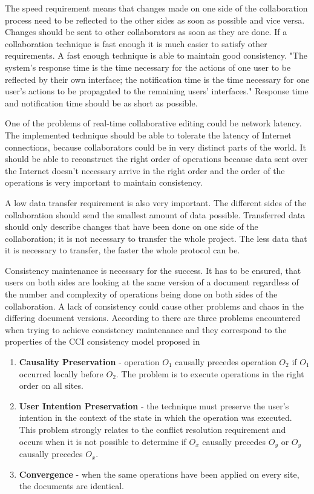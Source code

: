 \documentclass[12pt,oneside]{fithesis2}
\begin{document}
\par The speed requirement means that changes made on one side of the collaboration process need to be reflected to the other sides as soon as possible and vice versa. Changes should be sent to other collaborators as soon as they are done. If a collaboration technique is fast enough it is much easier to satisfy other requirements. A fast enough technique is able to maintain good consistency. "The system’s response time is the time necessary for the actions of one user to be reflected by their own interface; the notification time is the time necessary for one user’s actions to be propagated to the remaining users’ interfaces." \cite{Ellis} Response time and notification time should be as short as possible.  \par One of the problems of real-time collaborative editing could be network latency. The implemented technique should be able to tolerate the latency of Internet connections, because collaborators could be in very distinct parts of the world. It should be able to reconstruct the right order of operations because data sent over the Internet doesn't necessary arrive in the right order and the order of the operations is very important to maintain consistency.\par A low data transfer requirement is also very important. The different sides of the collaboration should send the smallest amount of data possible. Transferred data should only describe changes that have been done on one side of the collaboration; it is not necessary to transfer the whole project. The less data that it is necessary to transfer, the faster the whole protocol can be.  \par Consistency maintenance is necessary for the success. It has to be ensured, that users on both sides are looking at the same version of a document regardless of the number and complexity of operations being done on both sides of the collaboration. A lack of consistency could cause other problems and chaos in the differing document versions. According to \cite{Vidot} there are three problems encountered when trying to achieve consistency maintenance and they correspond to the properties of the CCI consistency model proposed in \cite{Sun}
\begin{enumerate}
\item \textbf{Causality Preservation} - operation \(O_{1}\) causally precedes operation \(O_{2}\) if \(O_{1}\) occurred locally before \(O_{2}\). The problem is to execute operations in the right order on all sites.
\item \textbf{User Intention Preservation} - the technique must preserve the user's intention in the context of the state in which the operation was executed. This problem strongly relates to the conflict resolution requirement and occurs when it is not possible to determine if \(O_{x}\) causally precedes \(O_{y}\) or \(O_{y}\) causally precedes \(O_{x}\).
\item \textbf{Convergence} - when the same operations have been applied on every site, the documents are identical.
\end{enumerate}
\end{document}
